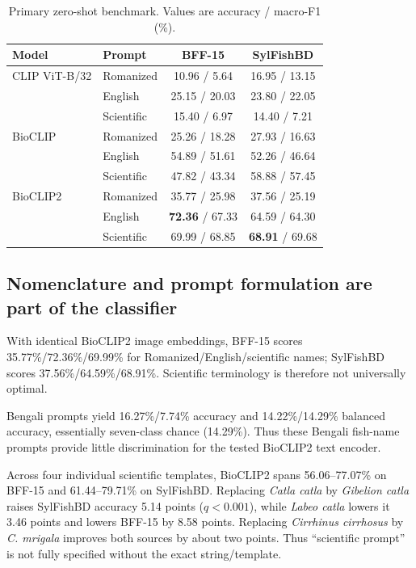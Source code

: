 \documentclass{article}
\begin{document}
\begin{table}[t]
\caption{Primary zero-shot benchmark. Values are accuracy / macro-F1 (\%).}
\label{tab:primary}
\centering
\small
\begin{tabular}{llcc}
\toprule
Model & Prompt & BFF-15 & SylFishBD \\
\midrule
CLIP ViT-B/32 & Romanized & 10.96 / 5.64 & 16.95 / 13.15 \\
 & English & 25.15 / 20.03 & 23.80 / 22.05 \\
 & Scientific & 15.40 / 6.97 & 14.40 / 7.21 \\
\midrule
BioCLIP & Romanized & 25.26 / 18.28 & 27.93 / 16.63 \\
 & English & 54.89 / 51.61 & 52.26 / 46.64 \\
 & Scientific & 47.82 / 43.34 & 58.88 / 57.45 \\
\midrule
BioCLIP2 & Romanized & 35.77 / 25.98 & 37.56 / 25.19 \\
 & English & \textbf{72.36} / 67.33 & 64.59 / 64.30 \\
 & Scientific & 69.99 / 68.85 & \textbf{68.91} / 69.68 \\
\bottomrule
\end{tabular}
\end{table}

\subsection{Nomenclature and prompt formulation are part of the classifier}
With identical BioCLIP2 image embeddings, BFF-15 scores 35.77\%/72.36\%/69.99\% for Romanized/English/scientific names; SylFishBD scores 37.56\%/64.59\%/68.91\%. Scientific terminology is therefore not universally optimal.

Bengali prompts yield 16.27\%/7.74\% accuracy and 14.22\%/14.29\% balanced accuracy, essentially seven-class chance (14.29\%). Thus these Bengali fish-name prompts provide little discrimination for the tested BioCLIP2 text encoder.

Across four individual scientific templates, BioCLIP2 spans 56.06--77.07\% on BFF-15 and 61.44--79.71\% on SylFishBD. Replacing \emph{Catla catla} by \emph{Gibelion catla} raises SylFishBD accuracy 5.14 points ($q<0.001$), while \emph{Labeo catla} lowers it 3.46 points and lowers BFF-15 by 8.58 points. Replacing \emph{Cirrhinus cirrhosus} by \emph{C. mrigala} improves both sources by about two points. Thus ``scientific prompt'' is not fully specified without the exact string/template.
\end{document}

